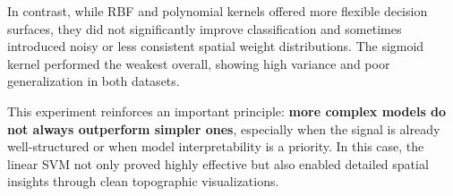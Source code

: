 \documentclass[
  letterpaper,
  DIV=11,
  numbers=noendperiod]{scrartcl}
\begin{document}
In contrast, while RBF and polynomial kernels offered more flexible
decision surfaces, they did not significantly improve classification and
sometimes introduced noisy or less consistent spatial weight
distributions. The sigmoid kernel performed the weakest overall, showing
high variance and poor generalization in both datasets.

This experiment reinforces an important principle: \textbf{more complex
models do not always outperform simpler ones}, especially when the
signal is already well-structured or when model interpretability is a
priority. In this case, the linear SVM not only proved highly effective
but also enabled detailed spatial insights through clean topographic
visualizations.

\begin{figure}

\end{figure}
\end{document}
